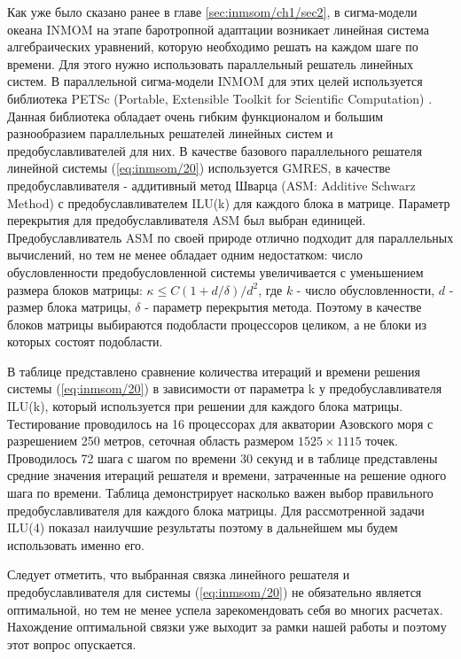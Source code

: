     Как уже было сказано ранее в главе \ref{sec:inmsom/ch1/sec2}, в сигма-модели океана INMOM на этапе баротропной адаптации возникает линейная система алгебраических уравнений, которую необходимо решать на каждом шаге по времени. Для этого нужно использовать параллельный решатель линейных систем. 
    В параллельной сигма-модели INMOM для этих целей используется библиотека PETSc (Portable, Extensible Toolkit for
Scientific Computation) \cite{PETSc}.
    Данная библиотека обладает очень гибким функционалом и большим разнообразием
    параллельных решателей линейных систем и предобуславливателей для них.
    В качестве базового параллельного решателя линейной системы (\ref{eq:inmsom/20}) 
    используется GMRES,  в качестве предобуславливателя - аддитивный метод Шварца (ASM: Additive Schwarz Method) с предобуславливателем ILU(k) для каждого блока в матрице.
    Параметр перекрытия для предобуславливателя ASM был выбран единицей.
    Предобуславливатель ASM по своей природе отлично подходит для параллельных вычислений,
    но тем не менее обладает одним
    недостатком: число обусловленности предобусловленной системы увеличивается с уменьшением размера блоков матрицы: $\kappa \leq C(1 + d/\delta)/d^2$, где $k$ - число обусловленности, $d$ - размер блока матрицы, $\delta$ - параметр перекрытия метода. %
     Поэтому в качестве блоков матрицы выбираются подобласти процессоров целиком, а не блоки из которых состоят подобласти.
    
    В таблице представлено сравнение количества итераций и времени решения системы (\ref{eq:inmsom/20})
    в зависимости от параметра k у предобуславливателя ILU(k), который используется при решении для каждого блока матрицы. Тестирование проводилось на 16 процессорах для акватории Азовского моря с разрешением 250 метров, сеточная область размером $1525 \times 1115$ точек. Проводилось 72 шага с шагом по времени 30 секунд и в таблице представлены средние значения итераций решателя и времени, затраченные на решение одного шага по времени.      
    Таблица демонстрирует насколько важен выбор правильного предобуславливателя для каждого блока матрицы. Для рассмотренной задачи ILU(4) показал наилучшие результаты поэтому в дальнейшем мы будем использовать именно его.
    
    Следует отметить, что выбранная связка линейного решателя и предобуславливателя
    для системы (\ref{eq:inmsom/20}) не обязательно является оптимальной,
    но тем не менее успела зарекомендовать себя во многих расчетах.
    Нахождение оптимальной связки уже выходит за рамки нашей работы и 
    поэтому этот вопрос опускается.

